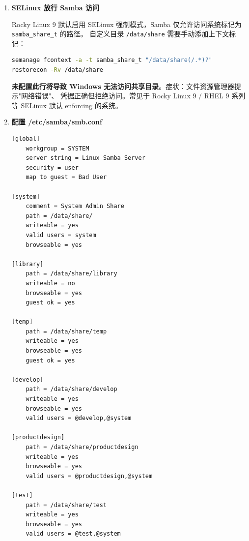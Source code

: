 \documentclass[12pt,a4paper]{ctexart}
\begin{document}
\begin{enumerate}[label=\arabic*.,leftmargin=*]
\begin{cmdbox}
\begin{lstlisting}[language=bash]
setfacl -m g:develop:rwx /data/share/develop_test
setfacl -m g:test:rwx    /data/share/develop_test
  \end{lstlisting}
  \end{cmdbox}

  \item \textbf{SELinux 放行 Samba 访问}

  Rocky Linux 9 默认启用 SELinux 强制模式，Samba 仅允许访问系统标记为 \texttt{samba\_share\_t} 的路径。
  自定义目录 \texttt{/data/share} 需要手动添加上下文标记：

  \begin{cmdbox}
  \small
  \begin{lstlisting}[language=bash]
semanage fcontext -a -t samba_share_t "/data/share(/.*)?"
restorecon -Rv /data/share
  \end{lstlisting}
  \end{cmdbox}

  \begin{warnbox}
    \textbf{未配置此行将导致 Windows 无法访问共享目录}。症状：文件资源管理器提示"网络错误"、
    凭据正确但拒绝访问。常见于 Rocky Linux 9 / RHEL 9 系列等 SELinux 默认 enforcing 的系统。
  \end{warnbox}

  \item \textbf{配置 /etc/samba/smb.conf}

  \begin{cmdbox}
  \small
  \begin{lstlisting}[language=bash]
[global]
    workgroup = SYSTEM
    server string = Linux Samba Server
    security = user
    map to guest = Bad User

[system]
    comment = System Admin Share
    path = /data/share/
    writeable = yes
    valid users = system
    browseable = yes

[library]
    path = /data/share/library
    writeable = no
    browseable = yes
    guest ok = yes

[temp]
    path = /data/share/temp
    writeable = yes
    browseable = yes
    guest ok = yes

[develop]
    path = /data/share/develop
    writeable = yes
    browseable = yes
    valid users = @develop,@system

[productdesign]
    path = /data/share/productdesign
    writeable = yes
    browseable = yes
    valid users = @productdesign,@system

[test]
    path = /data/share/test
    writeable = yes
    browseable = yes
    valid users = @test,@system


\end{lstlisting}
\end{cmdbox}
\end{enumerate}
\end{document}
